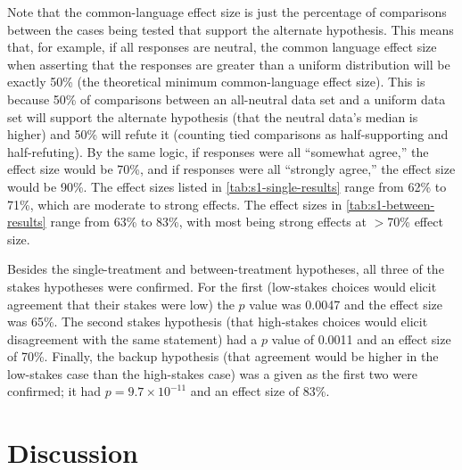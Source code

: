 Note that the common-language effect size is just the percentage of comparisons between the cases being tested that support the alternate hypothesis.
%
This means that, for example, if all responses are neutral, the common language effect size when asserting that the responses are greater than a uniform distribution will be exactly 50\% (the theoretical minimum common-language effect size).
%
This is because 50\% of comparisons between an all-neutral data set and a uniform data set will support the alternate hypothesis (that the neutral data's median is higher) and 50\% will refute it (counting tied comparisons as half-supporting and half-refuting).
%
By the same logic, if responses were all ``somewhat agree,'' the effect size would be 70\%, and if responses were all ``strongly agree,'' the effect size would be 90\%.
%
The effect sizes listed in \cref{tab:s1-single-results} range from 62\% to 71\%, which are moderate to strong effects.
%
The effect sizes in \cref{tab:s1-between-results} range from 63\% to 83\%, with most being strong effects at $>$70\% effect size.


Besides the single-treatment and between-treatment hypotheses, all three of the stakes hypotheses were confirmed.
%
For the first (low-stakes choices would elicit agreement that their stakes were low) the $p$ value was 0.0047 and the effect size was 65\%.
%
The second stakes hypothesis (that high-stakes choices would elicit disagreement with the same statement) had a $p$ value of 0.0011 and an effect size of 70\%.
%
Finally, the backup hypothesis (that agreement would be higher in the low-stakes case than the high-stakes case) was a given as the first two were confirmed; it had $p = 9.7\times10^{-11}$ and an effect size of 83\%.


\section{Discussion}

